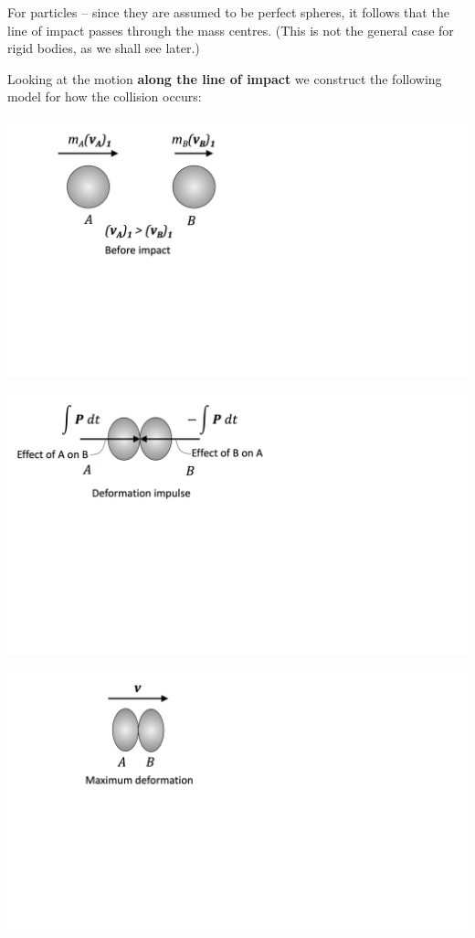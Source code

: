 \documentclass[12pt,letterpaper,twoside]{report}
\begin{document}
For particles – since they are assumed to be perfect spheres, it follows that the line of impact passes through the mass centres.  (This is not the general case for rigid bodies, as we shall see later.)

\newpage

Looking at the motion \textbf{along the line of impact} we construct the following model for how the collision occurs:

\begin{minipage}{0.37\textwidth}


\includegraphics[trim={0cm 9cm 15cm 0cm},clip,height=0.6\textwidth, center]{Slide107}

\includegraphics[trim={0cm 9cm 15cm 0cm},clip,height=0.6\textwidth, center]{Slide108}

\includegraphics[trim={0cm 9cm 15cm 0cm},clip,height=0.6\textwidth, center]{Slide109}


\end{minipage}
\end{document}
